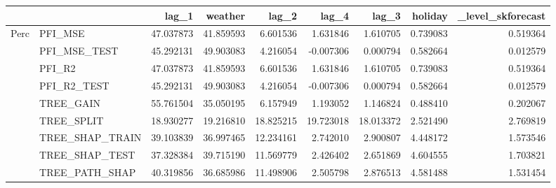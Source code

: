 \begin{tabular}{llrrrrrrr}
\toprule
 &  & lag_1 & weather & lag_2 & lag_4 & lag_3 & holiday & _level_skforecast \\
\midrule
\multirow[t]{9}{*}{Perc} & PFI_MSE & 47.037873 & 41.859593 & 6.601536 & 1.631846 & 1.610705 & 0.739083 & 0.519364 \\
 & PFI_MSE_TEST & 45.292131 & 49.903083 & 4.216054 & -0.007306 & 0.000794 & 0.582664 & 0.012579 \\
 & PFI_R2 & 47.037873 & 41.859593 & 6.601536 & 1.631846 & 1.610705 & 0.739083 & 0.519364 \\
 & PFI_R2_TEST & 45.292131 & 49.903083 & 4.216054 & -0.007306 & 0.000794 & 0.582664 & 0.012579 \\
 & TREE_GAIN & 55.761504 & 35.050195 & 6.157949 & 1.193052 & 1.146824 & 0.488410 & 0.202067 \\
 & TREE_SPLIT & 18.930277 & 19.216810 & 18.825215 & 19.723018 & 18.013372 & 2.521490 & 2.769819 \\
 & TREE_SHAP_TRAIN & 39.103839 & 36.997465 & 12.234161 & 2.742010 & 2.900807 & 4.448172 & 1.573546 \\
 & TREE_SHAP_TEST & 37.328384 & 39.715190 & 11.569779 & 2.426402 & 2.651869 & 4.604555 & 1.703821 \\
 & TREE_PATH_SHAP & 40.319856 & 36.685986 & 11.498906 & 2.505798 & 2.876513 & 4.581488 & 1.531454 \\
\cline{1-9}
\bottomrule
\end{tabular}
